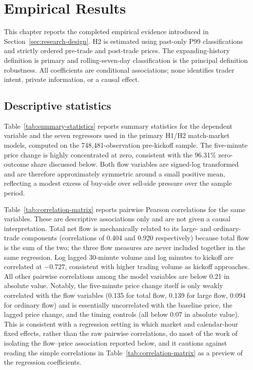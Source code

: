 \section{Empirical Results}
\label{sec:results}

This chapter reports the completed empirical evidence introduced in
Section~\ref{sec:research-design}. H2 is estimated using past-only P99
classifications and strictly ordered pre-trade and post-trade prices. The
expanding-history definition is primary and rolling-seven-day classification is
the principal definition robustness. All coefficients are conditional
associations; none identifies trader intent, private information, or a causal
effect.

\subsection{Descriptive statistics}

Table~\ref{tab:summary-statistics} reports summary statistics for the
dependent variable and the seven regressors used in the primary H1/H2
match-market models, computed on the 748,481-observation pre-kickoff sample.
The five-minute price change is highly concentrated at zero, consistent with
the 96.31\% zero-outcome share discussed below. Both flow variables are
signed-log transformed and are therefore approximately symmetric around a
small positive mean, reflecting a modest excess of buy-side over sell-side
pressure over the sample period.

Table~\ref{tab:correlation-matrix} reports pairwise Pearson correlations for
the same variables. These are descriptive associations only and are not
given a causal interpretation. Total net flow is mechanically related to its
large- and ordinary-trade components (correlations of 0.404 and 0.920
respectively) because total flow is the sum of the two; the three flow
measures are never included together in the same regression. Log lagged
30-minute volume and log minutes to kickoff are correlated at $-0.727$,
consistent with higher trading volume as kickoff approaches. All other
pairwise correlations among the model variables are below 0.21 in absolute
value. Notably, the five-minute price change itself is only weakly correlated
with the flow variables (0.135 for total flow, 0.139 for large flow, 0.094 for
ordinary flow) and is essentially uncorrelated with the baseline price, the
lagged price change, and the timing controls (all below 0.07 in absolute
value). This is consistent with a regression setting in which market and
calendar-hour fixed effects, rather than the raw pairwise correlations, do
most of the work of isolating the flow--price association reported below, and
it cautions against reading the simple correlations in Table~\ref{tab:correlation-matrix}
as a preview of the regression coefficients.

